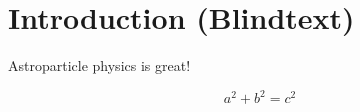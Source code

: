 \chapter{Introduction (Blindtext)}
\nocite{biblatex, siunitx, scikit-learn, Hunter:2007}%

Astroparticle physics is great!

\begin{equation}
  a^2 + b^2 = c^2
\end{equation}
%
\Blindtext
\blindtext

\blindtext
